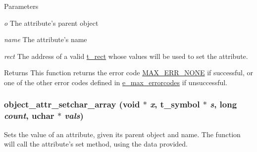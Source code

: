 \begin{DoxyParams}{Parameters}
\item[{\em o}]The attribute's parent object \item[{\em name}]The attribute's name \item[{\em rect}]The address of a valid \hyperlink{structt__rect}{t\_\-rect} whose values will be used to set the attribute.\end{DoxyParams}
\begin{DoxyReturn}{Returns}
This function returns the error code \hyperlink{group__misc_gga0764dd6c02b76cca7d053ae50555d69da6d22f77fef8b1e1b074cef5d29d935fd}{MAX\_\-ERR\_\-NONE} if successful, or one of the other error codes defined in \hyperlink{group__misc_ga0764dd6c02b76cca7d053ae50555d69d}{e\_\-max\_\-errorcodes} if unsuccessful. 
\end{DoxyReturn}
\hypertarget{group__attr_gacedd5350a43805a15df9a200fdf19690}{
\subsubsection[{object\_\-attr\_\-setchar\_\-array}]{ object\_\-attr\_\-setchar\_\-array (void $\ast$ {\em x}, \/  {\bf t\_\-symbol} $\ast$ {\em s}, \/  long {\em count}, \/  {\bf uchar} $\ast$ {\em vals})}}
\label{group__attr_gacedd5350a43805a15df9a200fdf19690}


Sets the value of an attribute, given its parent object and name. The function will call the attribute's {\ttfamily set} method, using the data provided.


